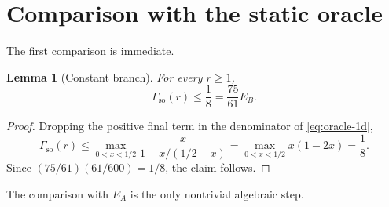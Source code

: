 \documentclass[11pt]{article}
\newtheorem{lemma}[theorem]{Lemma}
\theoremstyle{definition}
\theoremstyle{remark}
\newcommand{\so}{\mathrm{so}}
\begin{document}
\section{Comparison with the static oracle}

The first comparison is immediate.

\begin{lemma}[Constant branch]
For every $r\ge1$,
\begin{equation}
\Gamma_{\so}(r)\le \frac18=\frac{75}{61}E_B.
\label{eq:oracle-EB}
\end{equation}
\end{lemma}
\begin{proof}
Dropping the positive final term in the denominator of \eqref{eq:oracle-1d},
\[
\Gamma_{\so}(r)
\le
\max_{0<x<1/2}
\frac{x}{1+x/(1/2-x)}
=
\max_{0<x<1/2}x(1-2x)
=\frac18.
\]
Since $(75/61)(61/600)=1/8$, the claim follows.
\end{proof}

The comparison with $E_A$ is the only nontrivial algebraic step.
\end{document}
